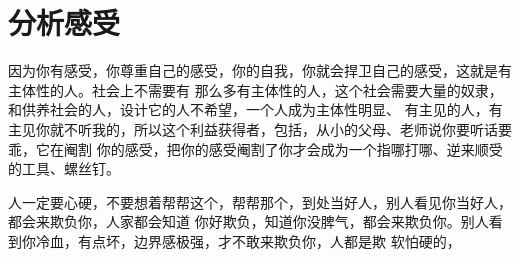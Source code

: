 \documentclass{book}
\begin{document}
\chapter{分析感受}

因为你有感受，你尊重自己的感受，你的自我，你就会捍卫自己的感受，这就是有主体性的人。社会上不需要有
那么多有主体性的人，这个社会需要大量的奴隶，和供养社会的人，设计它的人不希望，一个人成为主体性明显、
有主见的人，有主见你就不听我的，所以这个利益获得者，包括，从小的父母、老师说你要听话要乖，它在阉割
你的感受，把你的感受阉割了你才会成为一个指哪打哪、逆来顺受的工具、螺丝钉。

人一定要心硬，不要想着帮帮这个，帮帮那个，到处当好人，别人看见你当好人，都会来欺负你，人家都会知道
你好欺负，知道你没脾气，都会来欺负你。别人看到你冷血，有点坏，边界感极强，才不敢来欺负你，人都是欺
软怕硬的，
\end{document}
